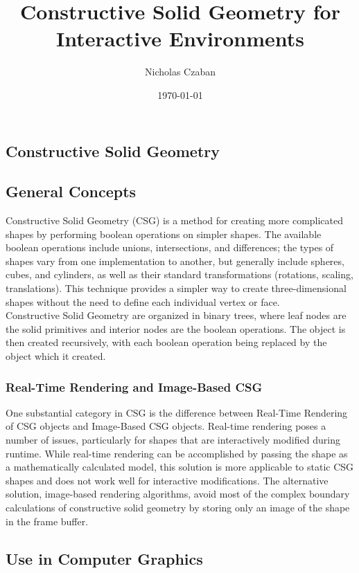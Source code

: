 \documentclass[12pt]{article}
\begin{document}
\title{Constructive Solid Geometry for Interactive Environments}
\author{Nicholas Czaban}
\date{\today}
\maketitle
\begin{doublespace}
\section{Constructive Solid Geometry}
\subsection{General Concepts}
Constructive Solid Geometry (CSG) is a method for creating more complicated shapes by performing boolean operations on simpler shapes. The available boolean operations include unions, intersections, and differences; the types of shapes vary from one implementation to another, but generally include spheres, cubes, and cylinders, as well as their standard transformations (rotations, scaling, translations)\cite{cs_dictionary}. This technique provides a simpler way to create three-dimensional shapes without the need to define each individual vertex or face.\\

Constructive Solid Geometry are organized in binary trees, where leaf nodes are the solid primitives and interior nodes are the boolean operations. The object is then created recursively, with each boolean operation being replaced by the object which it created\cite{gold}.
\subsubsection{Real-Time Rendering and Image-Based CSG}
One substantial category in CSG is the difference between Real-Time Rendering of CSG objects and Image-Based CSG objects. Real-time rendering poses a number of issues, particularly for shapes that are interactively modified during runtime. While real-time rendering can be accomplished by passing the shape as a mathematically calculated model, this solution is more applicable to static CSG shapes and does not work well for interactive modifications\cite{open_csg}. The alternative solution, image-based rendering algorithms, avoid most of the complex boundary calculations of constructive solid geometry by storing only an image of the shape in the frame buffer\cite{open_csg}. 
\subsection{Use in Computer Graphics}

\end{doublespace}
\end{document}
